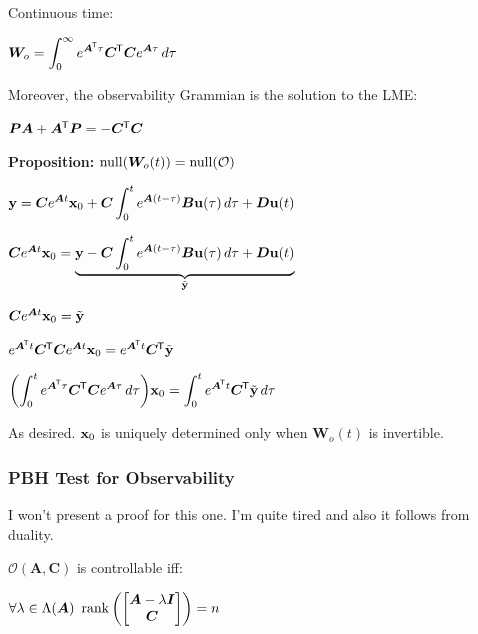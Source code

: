 \documentclass[11pt]{article}
\begin{document}
  \vspace{12pt}

  Continuous time:

  \(\displaystyle \bm{W}_o = \int_0^{\infty} e^{\bm{A}^{\mkern-1.5mu\mathsf{T}}\tau}\bm{C}^{\mkern-1.5mu\mathsf{T}}\bm{C}e^{\bm{A}\tau}\,d\tau\)

  \vspace{12pt}

  Moreover, the observability Grammian is the solution to the LME:

  \(\bm{P}\bm{A} + \bm{A}^{\mkern-1.5mu\mathsf{T}}\bm{P} = -\bm{C}^{\mkern-1.5mu\mathsf{T}}\bm{C}\)

  \vspace{12pt}

  \textbf{Proposition:} \(\mathrm{null}{\left( \bm{W}_o(t) \right)} = \mathrm{null}{\left( \mathcal{O} \right)}\)

  \(\mathbf{y} = \displaystyle \bm{C}e^{\bm{A}t}\mathbf{x}_0 +
  \bm{C}\int_0^t e^{\bm{A}(t - \tau)}\bm{B}\mathbf{u}(\tau)\,d\tau + \bm{D}\mathbf{u}(t)\)

  \(\bm{C}e^{\bm{A}t}\mathbf{x}_0 = \displaystyle
  \underbrace{\mathbf{y} - \bm{C}\int_0^t e^{\bm{A}(t - \tau)}\bm{B}\mathbf{u}(\tau)\,d\tau + \bm{D}\mathbf{u}(t)}_{\tilde{\mathbf{y}}}\)

  \(\bm{C}e^{\bm{A}t}\mathbf{x}_0 = \tilde{\mathbf{y}}\)

  \(e^{\bm{A}^{\mkern-1.5mu\mathsf{T}} t}\bm{C}^{{\mkern-1.5mu\mathsf{T}}}\bm{C}e^{\bm{A}t}\mathbf{x}_0 = e^{\bm{A}^{\mkern-1.5mu\mathsf{T}} t}\bm{C}^{{\mkern-1.5mu\mathsf{T}}}\tilde{\mathbf{y}}\)

  \(\displaystyle
  {\left( \int_0^t e^{\bm{A}^{\mkern-1.5mu\mathsf{T}}\tau}\bm{C}^{{\mkern-1.5mu\mathsf{T}}}\bm{C}e^{\bm{A}\tau}\,d\tau \right)} \mathbf{x}_0=
  \int_0^te^{\bm{A}^{\mkern-1.5mu\mathsf{T}} t}\bm{C}^{{\mkern-1.5mu\mathsf{T}}}\tilde{\mathbf{y}}\, d\tau\)

  As desired. \(\mathbf{x}_0\) is uniquely determined only when \(\bm{W}_o(t)\) is invertible.

  \subsubsection{PBH Test for Observability}

  I won't present a proof for this one. I'm quite tired and also it follows from duality.

  \(\mathcal{O}(\bm{A}, \bm{C})\) is controllable iff:

  \(\forall \lambda \in \spec{\bm{A}}\ \rank\prn{
    \begin{bmatrix}
      \bm{A} - \lambda\bm{I} \\
      \bm{C}
  \end{bmatrix}} = n\)

  \pagebreak
\end{document}
